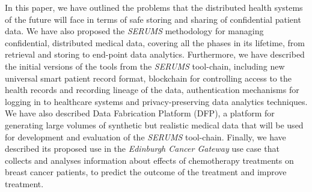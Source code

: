 \noindent
In this paper, we have outlined the problems that the distributed health systems of the future will face in terms of safe storing and sharing of confidential patient data. %
We have also proposed the \emph{SERUMS} methodology for managing confidential, distributed medical data, covering all the phases in its lifetime, from retrieval and storing to end-point data analytics. Furthermore, we have described the initial versions of the tools from the \emph{SERUMS} tool-chain, including new universal smart patient record format, blockchain for controlling access to the health records and recording lineage of the data, authentication mechanisms for logging in to healthcare systems and privacy-preserving data analytics techniques. We have also described Data Fabrication Platform (DFP), a platform for generating large volumes of synthetic but realistic medical data that will be used for development and evaluation of the \emph{SERUMS} tool-chain. Finally, we have described its proposed use in the \emph{Edinburgh Cancer Gateway} use case that collects and analyses information about effects of chemotherapy treatments on breast cancer patients, to predict the outcome of the treatment and improve treatment.
%
